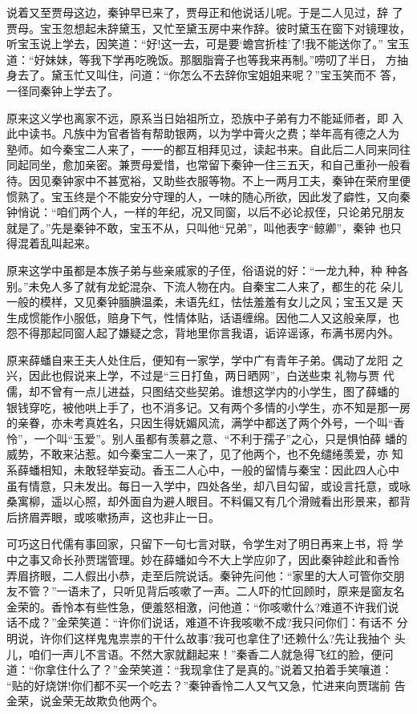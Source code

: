 说着又至贾母这边，秦钟早已来了，贾母正和他说话儿呢。于是二人见过，辞
了贾母。宝玉忽想起未辞黛玉，又忙至黛玉房中来作辞。彼时黛玉在窗下对镜理妆，
听宝玉说上学去，因笑道：“好!这一去，可是要‘蟾宫折桂’了!我不能送你了。”
宝玉道：“好妹妹，等我下学再吃晚饭。那胭脂膏子也等我来再制。”唠叨了半日，
方抽身去了。黛玉忙又叫住，问道：“你怎么不去辞你宝姐姐来呢？”宝玉笑而不
答，一径同秦钟上学去了。

原来这义学也离家不远，原系当日始祖所立，恐族中子弟有力不能延师者，即
入此中读书。凡族中为官者皆有帮助银两，以为学中膏火之费；举年高有德之人为
塾师。如今秦宝二人来了，一一的都互相拜见过，读起书来。自此后二人同来同往
同起同坐，愈加亲密。兼贾母爱惜，也常留下秦钟一住三五天，和自己重孙一般看
待。因见秦钟家中不甚宽裕，又助些衣服等物。不上一两月工夫，秦钟在荣府里便
惯熟了。宝玉终是个不能安分守理的人，一味的随心所欲，因此发了癖性，又向秦
钟悄说：“咱们两个人，一样的年纪，况又同窗，以后不必论叔侄，只论弟兄朋友
就是了。”先是秦钟不敢，宝玉不从，只叫他“兄弟”，叫他表字“鲸卿”，秦钟
也只得混着乱叫起来。

原来这学中虽都是本族子弟与些亲戚家的子侄，俗语说的好：“一龙九种，种
种各别。”未免人多了就有龙蛇混杂、下流人物在内。自秦宝二人来了，都生的花
朵儿一般的模样，又见秦钟腼腆温柔，未语先红，怯怯羞羞有女儿之风；宝玉又是
天生成惯能作小服低，赔身下气，性情体贴，话语缠绵。因他二人又这般亲厚，也
怨不得那起同窗人起了嫌疑之念，背地里你言我语，诟谇谣诼，布满书房内外。

原来薛蟠自来王夫人处住后，便知有一家学，学中广有青年子弟。偶动了龙阳
之兴，因此也假说来上学，不过是“三日打鱼，两日晒网”，白送些束礼物与贾
代儒，却不曾有一点儿进益，只图结交些契弟。谁想这学内的小学生，图了薛蟠的
银钱穿吃，被他哄上手了，也不消多记。又有两个多情的小学生，亦不知是那一房
的亲眷，亦未考真姓名，只因生得妩媚风流，满学中都送了两个外号，一个叫“香
怜”，一个叫“玉爱”。别人虽都有羡慕之意、“不利于孺子”之心，只是惧怕薛
蟠的威势，不敢来沾惹。如今秦宝二人一来了，见了他两个，也不免缱绻羡爱，亦
知系薛蟠相知，未敢轻举妄动。香玉二人心中，一般的留情与秦宝：因此四人心中
虽有情意，只未发出。每日一入学中，四处各坐，却八目勾留，或设言托意，或咏
桑寓柳，遥以心照，却外面自为避人眼目。不料偏又有几个滑贼看出形景来，都背
后挤眉弄眼，或咳嗽扬声，这也非止一日。

可巧这日代儒有事回家，只留下一句七言对联，令学生对了明日再来上书，将
学中之事又命长孙贾瑞管理。妙在薛蟠如今不大上学应卯了，因此秦钟趁此和香怜
弄眉挤眼，二人假出小恭，走至后院说话。秦钟先问他：“家里的大人可管你交朋
友不管？”一语未了，只听见背后咳嗽了一声。二人吓的忙回顾时，原来是窗友名
金荣的。香怜本有些性急，便羞怒相激，问他道：“你咳嗽什么?难道不许我们说
话不成？”金荣笑道：“许你们说话，难道不许我咳嗽不成?我只问你们：有话不
分明说，许你们这样鬼鬼祟祟的干什么故事?我可也拿住了!还赖什么?先让我抽个
头儿，咱们一声儿不言语。不然大家就翻起来！”秦香二人就急得飞红的脸，便问
道：“你拿住什么了？”金荣笑道：“我现拿住了是真的。”说着又拍着手笑嚷道：
“贴的好烧饼!你们都不买一个吃去？”秦钟香怜二人又气又急，忙进来向贾瑞前
告金荣，说金荣无故欺负他两个。

